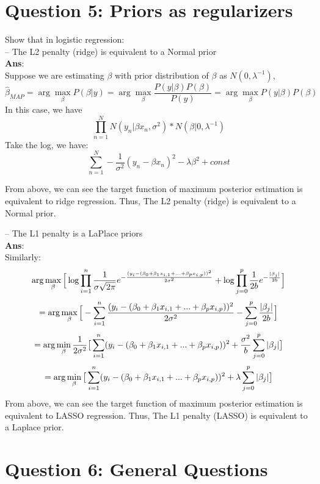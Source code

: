 \documentclass{article}
\begin{document}
\section{Question 5: Priors as regularizers}
Show that in logistic regression:\\
– The L2 penalty (ridge) is equivalent to a Normal prior\\
\textbf{Ans}: \\
Suppose we are estimating $\beta$ with prior distribution of $\beta$ as $N(0,\lambda^{-1})$,\\
$$\hat{\beta}_{MAP} = \arg\max_\beta {P(\beta | y) }
= \arg\max_ \beta\frac{P(y | \beta) P(\beta)}{P(y)} 
= \arg\max_\beta P(y | \beta) P(\beta)$$
In this case, we have 
$$
\prod_{n=1}^N N(y_n|\beta x_n,\sigma^2)*N(\beta|0, \lambda^{-1})
$$
Take the log, we have: 
$$
\sum_{n=1}^N -\frac{1}{\sigma^2}(y_n-\beta x_n)^2-\lambda \beta^2+ const
$$

From above, we can see the target function of maximum posterior estimation is equivalent to ridge regression.
Thus, The L2 penalty (ridge) is equivalent to a Normal prior.


– The L1 penalty is a LaPlace priors\\
\textbf{Ans}: \\
Similarly:
$$\arg\max_{\bf \beta} \Big[ \log \prod_{i=1}^{n} \frac{1}{\sigma\sqrt{2\pi}}e^{-\frac{(y_i- (\beta_0 + \beta_1 x_{i,1} + ... + \beta_p x_{i,p}))^2}{2\sigma^2}}
 + \log \prod_{j=0}^{p} \frac{1}{2b}e^{-\frac{|\beta_j|}{2b}} \Big] $$$$
= \arg\max_{\bf \beta} \Big[- \sum_{i=1}^{n} {\frac{(y_i- (\beta_0 + \beta_1 x_{i,1} + ... + \beta_p x_{i,p}))^2}{2\sigma^2}}
 - \sum_{j=0}^{p} {\frac{|\beta_j|}{2b}} \Big]$$$$
= \arg\min_{\bf \beta} \frac{1}{2\sigma^2} \big[ \sum_{i=1}^{n} (y_i-(\beta_0 + \beta_1 x_{i,1} + ... + \beta_p x_{i,p}))^2
 + \frac{\sigma^2}{b} \sum_{j=0}^{p} |\beta_j| \big] $$$$
= \arg\min_{\bf \beta} \big[ \sum_{i=1}^{n} (y_i-(\beta_0 + \beta_1 x_{i,1} + ... + \beta_p x_{i,p}))^2 + \lambda \sum_{j=0}^{p} |\beta_j| \big]$$
From above, we can see the target function of maximum posterior estimation is equivalent to LASSO regression.
Thus, The L1 penalty (LASSO) is equivalent to a Laplace prior.


\section{Question 6: General Questions }
\end{document}
